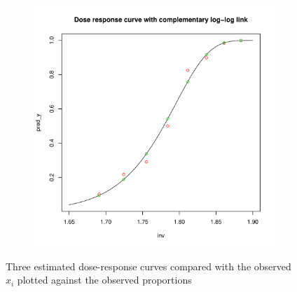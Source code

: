 \documentclass[]{article}
\begin{document}
\begin{enumerate}
{\begin{itemize}
\begin{figure}[ht!]
\begin{subfigure}[b]{0.3\textwidth}
            	\end{subfigure}
            	\begin{subfigure}[b]{0.3\textwidth}
            		\includegraphics[width = \textwidth]{pic/HW3_1/a3.pdf}
            	\end{subfigure}
            	\caption{Three estimated dose-response curves compared with the observed $x_i$ plotted against the observed proportions}
            	\label{2}
            \end{figure}
        	

\end{itemize}}
\end{enumerate}
\end{document}
